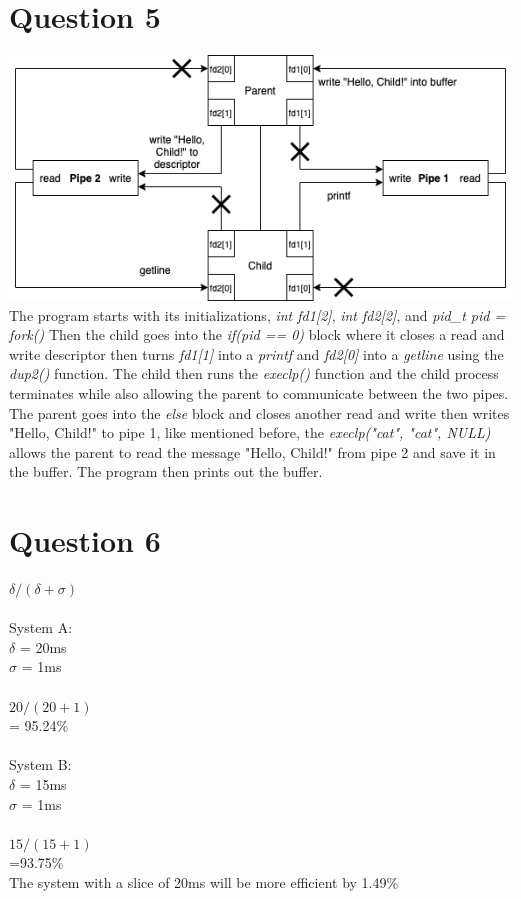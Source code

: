 \documentclass[11pt]{article}
\begin{document}
\section*{Question 5}
\includegraphics[scale=0.4]{COMS352HW2Q5.png}\\
The program starts with its initializations, \emph{int fd1[2]},
\emph{int fd2[2]}, and \emph{pid\_t pid = fork()} Then the child 
goes into the \emph{if(pid == 0)} block where it closes a read and
write descriptor then turns \emph{fd1[1]} into a \emph{printf} and 
\emph{fd2[0]} into 
a \emph{getline} using the \emph{dup2()} function. The child then
runs the \emph{execlp()} function and the child process terminates while
also allowing the parent to communicate between the two pipes.
The parent goes into the \emph{else} block and closes another read
and write then writes "Hello, Child!" to pipe 1, like mentioned before,
the \emph{execlp("cat", "cat", NULL)} allows the parent to read the 
message "Hello, Child!" from pipe 2 and save it in the buffer. The
program then prints out the buffer. 
\section*{Question 6}
    $\delta / (\delta + \sigma)$\\\\
    System A:\\
    $\delta$ = 20ms\\
    $\sigma$ = 1ms\\\\
    $20 / (20 + 1)$\\
    = 95.24\%\\\\
    System B:\\
    $\delta$ = 15ms\\
    $\sigma$ = 1ms\\\\
    $15 / (15 + 1)$\\
    =93.75\%\\
    The system with a slice of 20ms will be more efficient by 1.49\%
\end{document}
